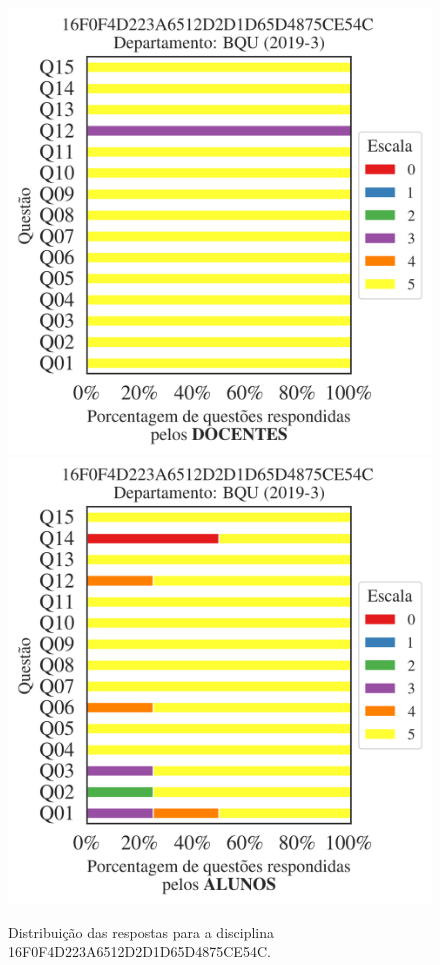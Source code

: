 \documentclass[a4paper,10pt]{article}
\begin{document}
\begin{figure}[h]
\centering
\includegraphics[width=0.485\linewidth]{analise_disciplina_departamento_BQU_16F0F4D223A6512D2D1D65D4875CE54C_docentes.png}
\includegraphics[width=0.485\linewidth]{analise_disciplina_departamento_BQU_16F0F4D223A6512D2D1D65D4875CE54C_alunos.png}
\caption{\label{fig:analise_geral_departamento}                Distribuição das respostas para a disciplina 16F0F4D223A6512D2D1D65D4875CE54C. }
\end{figure}
\end{document}
